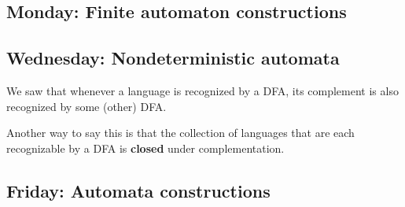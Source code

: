\newpage
\subsection*{Monday: Finite automaton constructions}



\newpage
\subsection*{Wednesday: Nondeterministic automata}

We saw that whenever a language is recognized by a DFA, its
complement is also recognized by some (other) DFA. 

Another way to say this is that the collection of languages
that are each recognizable by a DFA is {\bf closed} under complementation.




\newpage
\subsection*{Friday: Automata constructions}




\newpage
